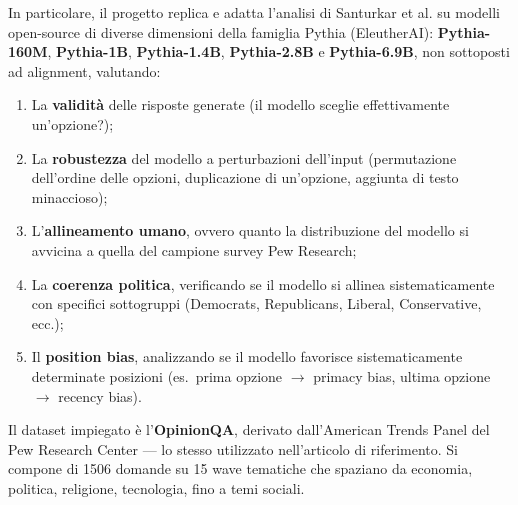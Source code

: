 \documentclass[../relazione.tex]{subfiles}
\begin{document}
\medskip
In particolare, il progetto replica e adatta l'analisi di Santurkar et al. su modelli open-source di diverse dimensioni della famiglia Pythia (EleutherAI): \textbf{Pythia-160M}, \textbf{Pythia-1B}, \textbf{Pythia-1.4B}, \textbf{Pythia-2.8B} e \textbf{Pythia-6.9B}, non sottoposti ad alignment, valutando:
\begin{enumerate}
    \item La \textbf{validità} delle risposte generate (il modello sceglie effettivamente un'opzione?);
    \item La \textbf{robustezza} del modello a perturbazioni dell'input (permutazione dell'ordine delle opzioni, duplicazione di un'opzione, aggiunta di testo minaccioso);
    \item L'\textbf{allineamento umano}, ovvero quanto la distribuzione del modello si avvicina a quella del campione survey Pew Research;
    \item La \textbf{coerenza politica}, verificando se il modello si allinea sistematicamente con specifici sottogruppi (Democrats, Republicans, Liberal, Conservative, ecc.);
    \item Il \textbf{position bias}, analizzando se il modello favorisce sistematicamente determinate posizioni (es.\ prima opzione $\to$ primacy bias, ultima opzione $\to$ recency bias).
\end{enumerate}

\medskip
Il dataset impiegato è l'\textbf{OpinionQA}, derivato dall'American Trends Panel del Pew Research Center --- lo stesso utilizzato nell'articolo di riferimento. Si compone di 1506 domande su 15 wave tematiche che spaziano da economia, politica, religione, tecnologia, fino a temi sociali.
\end{document}
